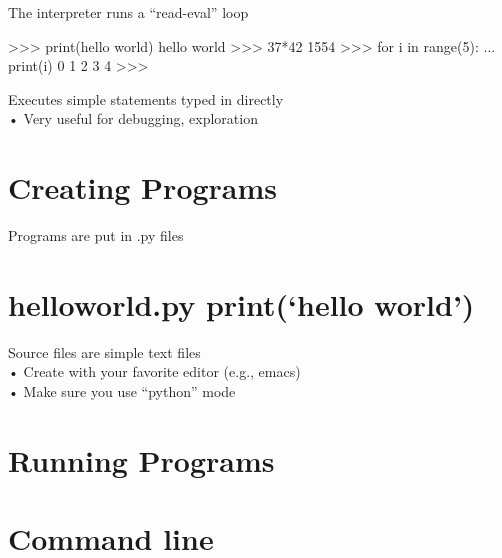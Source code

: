\documentclass[
  letterpaper,
  DIV=11,
  numbers=noendperiod]{scrreprt}
\newenvironment{Shaded}{\begin{snugshade}}{\end{snugshade}}
\newcommand{\NormalTok}[1]{\textcolor[rgb]{0.00,0.23,0.31}{#1}}
\begin{document}
The interpreter runs a ``read-eval'' loop

\begin{Shaded}
\begin{Highlighting}[]
\NormalTok{\textgreater{}\textgreater{}\textgreater{} print(\textquotesingle{}hello world\textquotesingle{})  }
\NormalTok{hello world  }
\NormalTok{\textgreater{}\textgreater{}\textgreater{} 37*42  }
\NormalTok{1554  }
\NormalTok{\textgreater{}\textgreater{}\textgreater{} for i in range(5):  }
\NormalTok{... print(i)  }
\NormalTok{0  }
\NormalTok{1  }
\NormalTok{2  }
\NormalTok{3  }
\NormalTok{4  }
\NormalTok{\textgreater{}\textgreater{}\textgreater{} }
\end{Highlighting}
\end{Shaded}

Executes simple statements typed in directly\\
• Very useful for debugging, exploration


\chapter{Creating Programs}\label{creating-programs}

Programs are put in .py files


\chapter{helloworld.py print(`hello
world')}\label{helloworld.py-printhello-world}

Source files are simple text files\\
• Create with your favorite editor (e.g., emacs)\\
• Make sure you use ``python'' mode


\chapter{Running Programs}\label{running-programs}


\chapter{Command line}\label{command-line}
\end{document}
